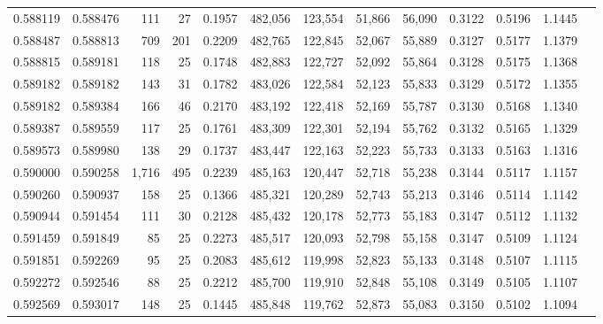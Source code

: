 \begin{tabular}{rrrrrrrrrrrrr}
0.588119 & 0.588476 &   111 &  27 &                                     0.1957 & 482,056 & 123,554 &  51,866 &  56,090 & 0.3122 & 0.5196 & 1.1445 \\
0.588487 & 0.588813 &   709 & 201 &                                     0.2209 & 482,765 & 122,845 &  52,067 &  55,889 & 0.3127 & 0.5177 & 1.1379 \\
0.588815 & 0.589181 &   118 &  25 &                                     0.1748 & 482,883 & 122,727 &  52,092 &  55,864 & 0.3128 & 0.5175 & 1.1368 \\
0.589182 & 0.589182 &   143 &  31 &                                     0.1782 & 483,026 & 122,584 &  52,123 &  55,833 & 0.3129 & 0.5172 & 1.1355 \\
0.589182 & 0.589384 &   166 &  46 &                                     0.2170 & 483,192 & 122,418 &  52,169 &  55,787 & 0.3130 & 0.5168 & 1.1340 \\
0.589387 & 0.589559 &   117 &  25 &                                     0.1761 & 483,309 & 122,301 &  52,194 &  55,762 & 0.3132 & 0.5165 & 1.1329 \\
0.589573 & 0.589980 &   138 &  29 &                                     0.1737 & 483,447 & 122,163 &  52,223 &  55,733 & 0.3133 & 0.5163 & 1.1316 \\
0.590000 & 0.590258 & 1,716 & 495 &                                     0.2239 & 485,163 & 120,447 &  52,718 &  55,238 & 0.3144 & 0.5117 & 1.1157 \\
0.590260 & 0.590937 &   158 &  25 &                                     0.1366 & 485,321 & 120,289 &  52,743 &  55,213 & 0.3146 & 0.5114 & 1.1142 \\
0.590944 & 0.591454 &   111 &  30 &                                     0.2128 & 485,432 & 120,178 &  52,773 &  55,183 & 0.3147 & 0.5112 & 1.1132 \\
0.591459 & 0.591849 &    85 &  25 &                                     0.2273 & 485,517 & 120,093 &  52,798 &  55,158 & 0.3147 & 0.5109 & 1.1124 \\
0.591851 & 0.592269 &    95 &  25 &                                     0.2083 & 485,612 & 119,998 &  52,823 &  55,133 & 0.3148 & 0.5107 & 1.1115 \\
0.592272 & 0.592546 &    88 &  25 &                                     0.2212 & 485,700 & 119,910 &  52,848 &  55,108 & 0.3149 & 0.5105 & 1.1107 \\
0.592569 & 0.593017 &   148 &  25 &                                     0.1445 & 485,848 & 119,762 &  52,873 &  55,083 & 0.3150 & 0.5102 & 1.1094 \\

\end{tabular}
